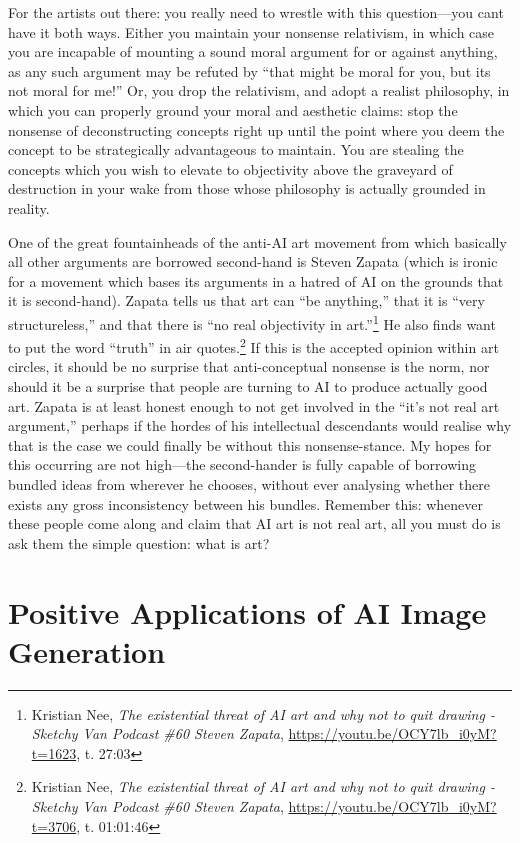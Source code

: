 \documentclass[11pt]{article}
\begin{document}
For the artists out there: you really need to wrestle with this question---you cant have it both ways. Either you maintain your nonsense relativism, in which case you are incapable of mounting a sound moral argument for or against anything, as any such argument may be refuted by ``that might be moral for you, but its not moral for me!'' Or, you drop the relativism, and adopt a realist philosophy, in which you can properly ground your moral and aesthetic claims: stop the nonsense of deconstructing concepts right up until the point where you deem the concept to be strategically advantageous to maintain. You are stealing the concepts which you wish to elevate to objectivity above the graveyard of destruction in your wake from those whose philosophy is actually grounded in reality.

One of the great fountainheads of the anti-AI art movement from which basically all other arguments are borrowed second-hand is Steven Zapata (which is ironic for a movement which bases its arguments in a hatred of AI on the grounds that it is second-hand). Zapata tells us that art can ``be anything,'' that it is ``very structureless,'' and that there is ``no real objectivity in art.''\footnote{Kristian Nee, \emph{The existential threat of AI art and why not to quit drawing - Sketchy Van Podcast \#60 Steven Zapata}, \url{https://youtu.be/OCY7lb\_i0yM?t=1623}, t. 27:03} He also finds want to put the word ``truth'' in air quotes.\footnote{Kristian Nee, \emph{The existential threat of AI art and why not to quit drawing - Sketchy Van Podcast \#60 Steven Zapata}, \url{https://youtu.be/OCY7lb\_i0yM?t=3706}, t. 01:01:46} If this is the accepted opinion within art circles, it should be no surprise that anti-conceptual nonsense is the norm, nor should it be a surprise that people are turning to AI to produce actually good art. Zapata is at least honest enough to not get involved in the ``it's not real art argument,'' perhaps if the hordes of his intellectual descendants would realise why that is the case we could finally be without this nonsense-stance. My hopes for this occurring are not high---the second-hander is fully capable of borrowing bundled ideas from wherever he chooses, without ever analysing whether there exists any gross inconsistency between his bundles. Remember this: whenever these people come along and claim that AI art is not real art, all you must do is ask them the simple question: what is art?

\section*{Positive Applications of AI Image Generation}
\label{sec:orgf5ad4ad}
\end{document}
